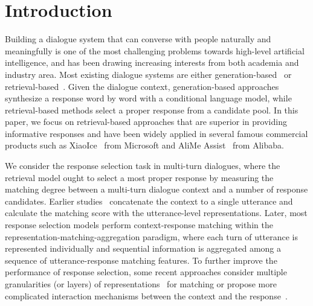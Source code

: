 \documentclass{article}
\begin{document}
\section{Introduction}


Building a dialogue system that can converse with people naturally and meaningfully is one of the most challenging problems towards high-level artificial intelligence, and has been drawing increasing interests from both academia and industry area.
Most existing dialogue systems are either generation-based~\cite{vinyals2015neural,serban2016building} or retrieval-based~\cite{wang-etal-2013-dataset,lowe-etal-2015-ubuntu,wu-etal-2017-sequential,tao2019multi}.
Given the dialogue context, generation-based approaches synthesize a response word by word with a conditional language model, while retrieval-based methods select a proper response from a candidate pool.
In this paper, we focus on retrieval-based approaches that are superior in providing informative responses and have been widely applied in several famous commercial products such as XiaoIce~\cite{shum2018eliza} from Microsoft and AliMe Assist~\cite{li2017alime} from Alibaba.

We consider the response selection task in multi-turn dialogues, where the retrieval model ought to select a most proper response by measuring the matching degree between a multi-turn dialogue context and a number of response candidates.
Earlier studies~\cite{wang-etal-2013-dataset,hu2014convolutional,lowe-etal-2015-ubuntu} concatenate the context to a single utterance and calculate the matching score with the utterance-level representations.
Later, most response selection models \cite{zhou-etal-2016-multi,wu-etal-2017-sequential,zhang-etal-2018-modeling} perform context-response matching within the representation-matching-aggregation paradigm, where each turn of utterance is represented individually and sequential information is aggregated among a sequence of utterance-response matching features.
To further improve the performance of response selection,
some recent approaches consider multiple granularities (or layers) of representations~\cite{zhou2018multi,tao2019multi,wang2019multi} for matching or propose more complicated interaction mechanisms between the context and the response~\cite{tao-etal-2019-one}. 
\end{document}
